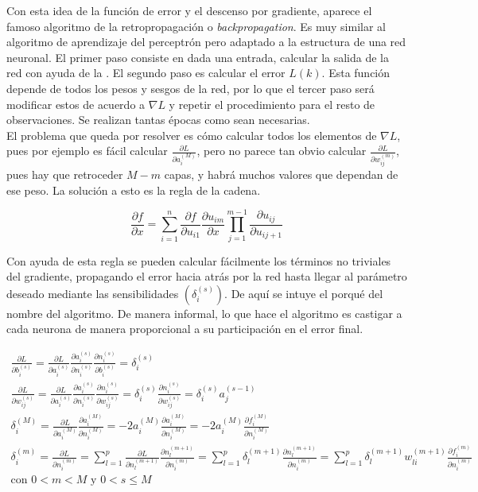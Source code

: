 		Con esta idea de la función de error y el descenso por gradiente, aparece el famoso algoritmo de la retropropagación o \textit{backpropagation}. Es muy similar al algoritmo de aprendizaje del perceptrón pero adaptado a la estructura de una red neuronal. El primer paso consiste en dada una entrada, calcular la salida de la red con ayuda de la . El segundo paso es calcular el error $L(k)$. Esta función depende de todos los pesos y sesgos de la red, por lo que el tercer paso será modificar estos de acuerdo a $\nabla L$ y repetir el procedimiento para el resto de observaciones. Se realizan tantas épocas como sean necesarias. \\
		
		El problema que queda por resolver es cómo calcular todos los elementos de $\nabla L$, pues por ejemplo es fácil calcular $\frac{\partial L}{\partial a_i^{(M)}}$, pero no parece tan obvio calcular $\frac{\partial L}{\partial w_{ij}^{(m)}}$, pues hay que retroceder $M-m$ capas, y habrá muchos valores que dependan de ese peso. La solución a esto es la regla de la cadena. 
		
		$$
		\frac{\partial f}{\partial x} = \sum_{i=1}^n \frac{\partial f}{\partial u_{i1}}\frac{\partial u_{im}}{\partial x}\prod_{j=1}^{m-1}\frac{\partial u_{ij}}{\partial u_{ij+1}}
		$$
		
		Con ayuda de esta regla se pueden calcular fácilmente los términos no triviales del gradiente, propagando el error hacia atrás por la red hasta llegar al parámetro deseado mediante las sensibilidades $\left(\delta_i^{(s)}\right)$\cite{nndesign}. De aquí se intuye el porqué del nombre del algoritmo. De manera informal, lo que hace el algoritmo es castigar a cada neurona de manera proporcional a su participación en el error final. 
		
		$$
		\begin{gathered}
			\frac{\partial L}{\partial b_{i}^{(s)}} = \frac{\partial L}{\partial a_{i}^{(s)}} \frac{\partial a_{i}^{(s)}}{\partial n_{i}^{(s)}} \frac{\partial n_{i}^{(s)}}{\partial b_{i}^{(s)}} = \delta_i^{(s)}\\
			\frac{\partial L}{\partial w_{ij}^{(s)}} = \frac{\partial L}{\partial a_{i}^{(s)}} \frac{\partial a_{i}^{(s)}}{\partial n_{i}^{(s)}} \frac{\partial n_{i}^{(s)}}{\partial w_{ij}^{(s)}} = \delta_i^{(s)} \frac{\partial n_{i}^{(s)}}{\partial w_{ij}^{(s)}} = \delta_i^{(s)} a_j^{(s-1)}\\
			\delta_i^{(M)} = \frac{\partial L}{\partial a_{i}^{(M)}} \frac{\partial a_{i}^{(M)}}{\partial n_{i}^{(M)}} = -2a_{i}^{(M)} \frac{\partial a_{i}^{(M)}}{\partial n_{i}^{(M)}} = -2a_{i}^{(M)} \frac{\partial f_{i}^{(M)}}{\partial n_{i}^{(M)}}\\
			\delta_i^{(m)} = \frac{\partial L}{\partial n_i^{(m)}} = \sum_{l=1}^p\frac{\partial L}{\partial n_l^{(m+1)}}\frac{\partial n_l^{(m+1)}}{\partial n_i^{(m)}} = \sum_{l=1}^p \delta_l^{(m+1)} \frac{\partial n_l^{(m+1)}}{\partial n_i^{(m)}} = \sum_{l=1}^p \delta_l^{(m+1)} w_{li}^{(m+1)} \frac{\partial f_i^{(m)}}{\partial n_i^{(m)}}\\
			\text{con } 0 < m < M \text{ y } 0 < s \leq M
		\end{gathered}
		$$
		
